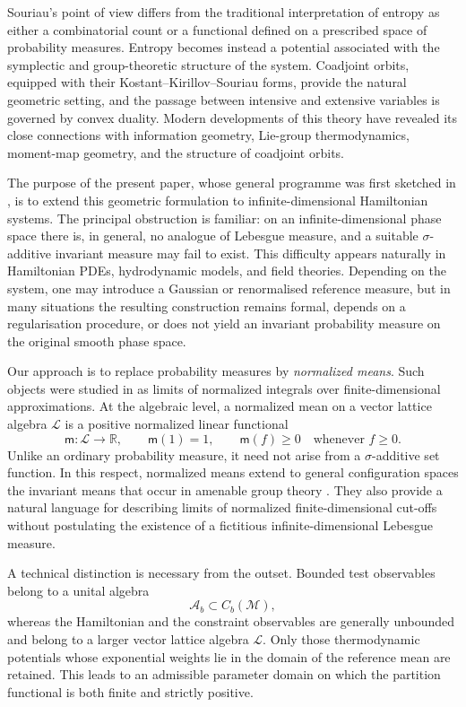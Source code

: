 \documentclass[11pt,reqno]{amsart}
\begin{document}
Souriau's point of view differs from the traditional interpretation of
entropy as either a combinatorial count or a functional defined on a
prescribed space of probability measures. Entropy becomes instead a
potential associated with the symplectic and group-theoretic structure
of the system. Coadjoint orbits, equipped with their
Kostant--Kirillov--Souriau forms, provide the natural geometric setting,
and the passage between intensive and extensive variables is governed
by convex duality. Modern developments of this theory
\cite{Barbaresco09,Barbaresco25,IglesiasSouriauBook,Marle16,Neeb26}
have revealed its close connections with information geometry,
Lie-group thermodynamics, moment-map geometry, and the structure of
coadjoint orbits.

The purpose of the present paper, whose general programme was first
sketched in \cite{MagnotAOP26}, is to extend this geometric formulation
to infinite-dimensional Hamiltonian systems. The principal obstruction
is familiar: on an infinite-dimensional phase space there is, in
general, no analogue of Lebesgue measure, and a suitable
$\sigma$-additive invariant measure may fail to exist. This difficulty
appears naturally in Hamiltonian PDEs, hydrodynamic models, and field
theories. Depending on the system, one may introduce a Gaussian or
renormalised reference measure, but in many situations the resulting
construction remains formal, depends on a regularisation procedure, or
does not yield an invariant probability measure on the original smooth
phase space.

Our approach is to replace probability measures by
\emph{normalized means}. Such objects were studied in
\cite{Magnot17} as limits of normalized integrals over
finite-dimensional approximations. At the algebraic level, a normalized
mean on a vector lattice algebra $\mathcal L$ is a positive normalized
linear functional
\[
\mathsf m\colon\mathcal L\longrightarrow\mathbb R,
\qquad
\mathsf m(1)=1,
\qquad
\mathsf m(f)\geq 0
\quad\text{whenever }f\geq 0.
\]
Unlike an ordinary probability measure, it need not arise from a
$\sigma$-additive set function. In this respect, normalized means extend
to general configuration spaces the invariant means that occur in
amenable group theory
\cite{vonNeumann29,Day57,Paterson88}. They also provide a natural
language for describing limits of normalized finite-dimensional
cut-offs without postulating the existence of a fictitious
infinite-dimensional Lebesgue measure.

A technical distinction is necessary from the outset. Bounded test
observables belong to a unital algebra
\[
\mathcal A_b\subset C_b(\mathcal M),
\]
whereas the Hamiltonian and the constraint observables are generally
unbounded and belong to a larger vector lattice algebra $\mathcal L$.
Only those thermodynamic potentials whose exponential weights lie in
the domain of the reference mean are retained. This leads to an
admissible parameter domain on which the partition functional is both
finite and strictly positive.
\end{document}
